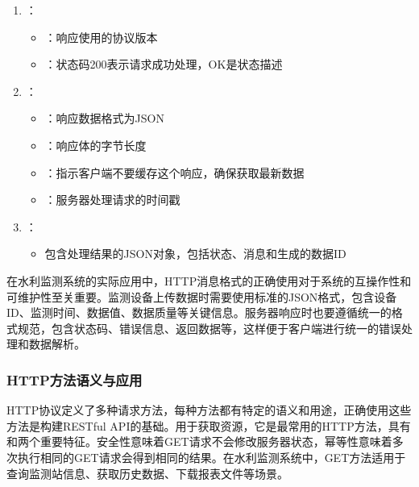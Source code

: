 
\begin{enumerate}
\def\labelenumi{\arabic{enumi}.}
\tightlist
\item
  ：

  \begin{itemize}
  \tightlist
  \item
    ：响应使用的协议版本
  \item
    ：状态码200表示请求成功处理，OK是状态描述
  \end{itemize}
\item
  ：

  \begin{itemize}
  \tightlist
  \item
    ：响应数据格式为JSON
  \item
    ：响应体的字节长度
  \item
    ：指示客户端不要缓存这个响应，确保获取最新数据
  \item
    ：服务器处理请求的时间戳
  \end{itemize}
\item
  ：

  \begin{itemize}
  \tightlist
  \item
    包含处理结果的JSON对象，包括状态、消息和生成的数据ID
  \end{itemize}
\end{enumerate}

在水利监测系统的实际应用中，HTTP消息格式的正确使用对于系统的互操作性和可维护性至关重要。监测设备上传数据时需要使用标准的JSON格式，包含设备ID、监测时间、数据值、数据质量等关键信息。服务器响应时也要遵循统一的格式规范，包含状态码、错误信息、返回数据等，这样便于客户端进行统一的错误处理和数据解析。

\hypertarget{httpux65b9ux6cd5ux8bedux4e49ux4e0eux5e94ux7528}{%
\subsubsection{HTTP方法语义与应用}\label{httpux65b9ux6cd5ux8bedux4e49ux4e0eux5e94ux7528}}

HTTP协议定义了多种请求方法，每种方法都有特定的语义和用途，正确使用这些方法是构建RESTful API的基础。用于获取资源，它是最常用的HTTP方法，具有和两个重要特征。安全性意味着GET请求不会修改服务器状态，幂等性意味着多次执行相同的GET请求会得到相同的结果。在水利监测系统中，GET方法适用于查询监测站信息、获取历史数据、下载报表文件等场景。

